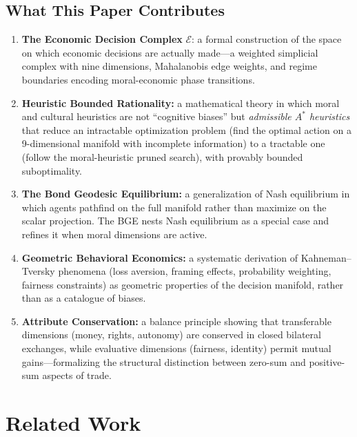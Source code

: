 \documentclass[12pt]{article}
\theoremstyle{definition}
\theoremstyle{remark}
\newcommand{\E}{\mathcal{E}}               %
\begin{document}
\subsection{What This Paper Contributes}

\begin{enumerate}
    \item \textbf{The Economic Decision Complex} $\E$: a formal construction of the space on which economic decisions are actually made---a weighted simplicial complex with nine dimensions, Mahalanobis edge weights, and regime boundaries encoding moral-economic phase transitions.

    \item \textbf{Heuristic Bounded Rationality:} a mathematical theory in which moral and cultural heuristics are not ``cognitive biases'' but \emph{admissible $A^*$ heuristics} that reduce an intractable optimization problem (find the optimal action on a 9-dimensional manifold with incomplete information) to a tractable one (follow the moral-heuristic pruned search), with provably bounded suboptimality.

    \item \textbf{The Bond Geodesic Equilibrium:} a generalization of Nash equilibrium in which agents pathfind on the full manifold rather than maximize on the scalar projection.  The BGE nests Nash equilibrium as a special case and refines it when moral dimensions are active.

    \item \textbf{Geometric Behavioral Economics:} a systematic derivation of Kahneman--Tversky phenomena (loss aversion, framing effects, probability weighting, fairness constraints) as geometric properties of the decision manifold, rather than as a catalogue of biases.

    \item \textbf{Attribute Conservation:} a balance principle showing that transferable dimensions (money, rights, autonomy) are conserved in closed bilateral exchanges, while evaluative dimensions (fairness, identity) permit mutual gains---formalizing the structural distinction between zero-sum and positive-sum aspects of trade.
\end{enumerate}


\section{Related Work}
\label{sec:related}
\end{document}
